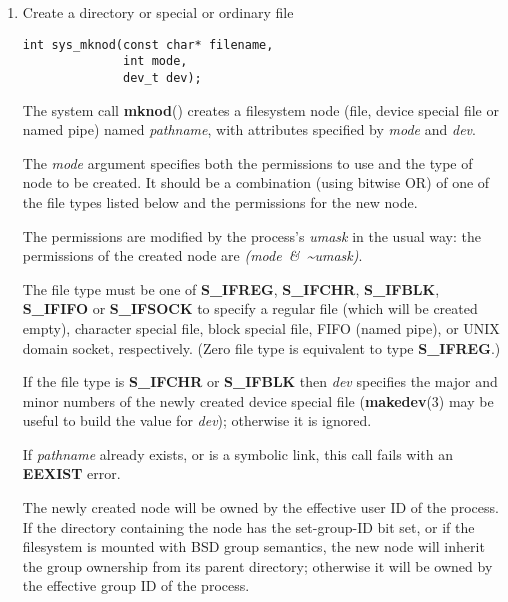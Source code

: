 \documentclass[twoside]{article}
\begin{document}
\begin{multicols}{2}
\begin{enumerate}
{\bf time}{\rm ()}
returns the time as the number of seconds since the
Epoch, 1970-01-01 00:00:00 +0000 (UTC).

If
{\it t}
is non-NULL,
the return value is also stored in the memory pointed to by
{\it t}{\rm .}

On success, the value of time in seconds since the Epoch is returned.
On error, %
\it ((time\_t)\ --1) \rm%
is returned, and %
\it errno \rm%
is set
appropriately.

\item
Create a directory or special or ordinary file
{\footnotesize
\begin{lstlisting}
int sys_mknod(const char* filename,
              int mode, 
              dev_t dev);
\end{lstlisting}
\par}

The system call
{\bf mknod}{\rm ()}
creates a filesystem node (file, device special file or
named pipe) named
{\it pathname}{\rm ,}
with attributes specified by
{\it mode}
and
{\it dev}{\rm .}

The
{\it mode}
argument specifies both the permissions to use and the type of node
to be created.
It should be a combination (using bitwise OR) of one of the file types
listed below and the permissions for the new node.

The permissions are modified by the process's
{\it umask}
in the usual way: the permissions of the created node are
{\it (mode\ \&\ \~{}umask)}{\rm .}

The file type must be one of
{\bf S\_IFREG}{\rm ,}
{\bf S\_IFCHR}{\rm ,}
{\bf S\_IFBLK}{\rm ,}
{\bf S\_IFIFO}
or
{\bf S\_IFSOCK}
to specify a regular file (which will be created empty), character
special file, block special file, FIFO (named pipe), or UNIX domain socket,
respectively.
(Zero file type is equivalent to type
{\bf S\_IFREG}{\rm .)}

If the file type is
{\bf S\_IFCHR}
or
{\bf S\_IFBLK}
then
{\it dev}
specifies the major and minor numbers of the newly created device
special file
{\rm (}{\bf makedev}{\rm (3)}
may be useful to build the value for
{\it dev}{\rm );}
otherwise it is ignored.

If
{\it pathname}
already exists, or is a symbolic link, this call fails with an
{\bf EEXIST}
error.

The newly created node will be owned by the effective user ID of the
process.
If the directory containing the node has the set-group-ID
bit set, or if the filesystem is mounted with BSD group semantics, the
new node will inherit the group ownership from its parent directory;
otherwise it will be owned by the effective group ID of the process.


\end{enumerate}
\end{multicols}
\end{document}
